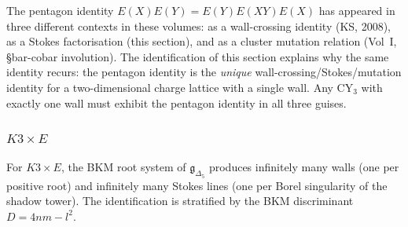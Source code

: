 \begin{remark}
\label{rem:pentagon-resurgence}
The pentagon identity $E(X)E(Y) = E(Y)E(XY)E(X)$ has appeared in three different contexts in these volumes: as a wall-crossing identity (KS, 2008), as a Stokes factorisation (this section), and as a cluster mutation relation (Vol~I, \S bar-cobar involution). The identification of this section explains why the same identity recurs: the pentagon identity is the \emph{unique} wall-crossing/Stokes/mutation identity for a two-dimensional charge lattice with a single wall. Any CY$_3$ with exactly one wall must exhibit the pentagon identity in all three guises.
\end{remark}

\subsubsection{\texorpdfstring{$K3 \times E$}{K3 x E}}
\label{subsubsec:k3e-verification}
%

For $K3 \times E$, the BKM root system of $\mathfrak{g}_{\Delta_5}$ produces infinitely many walls (one per positive root) and infinitely many Stokes lines (one per Borel singularity of the shadow tower). The identification is stratified by the BKM discriminant $D = 4nm - l^2$.

